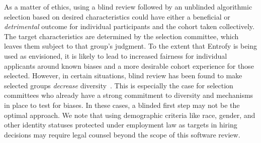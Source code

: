 \documentclass[10pt,letterpaper]{article}
\begin{document}
As a matter of ethics, using a blind review followed by an unblinded algorithmic selection based on desired characteristics could have either a beneficial or \emph{detrimental} outcome for individual participants and the cohort taken collectively.
The target characteristics are determined by the selection committee, which leaves them subject to that group's judgment.
To the extent that Entrofy is being used as envisioned, it is likely to lead to increased fairness for individual applicants around known biases and a more desirable cohort experience for those selected.
However, in certain situations, blind review has been found to make selected groups \textit{decrease} diversity~\cite{behaghel2015unintended}.
This is especially the case for selection committees who already have a strong commitment to diversity and mechanisms in place to test for biases.
In these cases, a blinded first step may not be the optimal approach.
We note that using demographic criteria like race, gender, and other identity statuses protected under employment law as targets in hiring decisions may require legal counsel beyond the scope of this software review.





\end{document}
